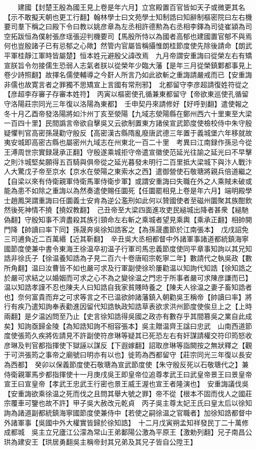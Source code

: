 　　建國【封楚王殷為國王見上卷是年六月】立宫殿置百官皆如天子或微更其名【示不敢擬天朝也更工行翻】翰林學士曰文苑學士知制誥曰知辭制樞密院曰左右機要司羣下稱之曰殿下令曰教以姚彦章為左丞相許德勲為右丞相李鐸為司徒崔潁為司空拓跋恒為僕射張彦瑶張迎判機要司【馬殷所恃以為國者高郁也建國置官郁不與焉何也豈殷諸子已有忌郁之心歟】然管内官屬皆稱攝惟朗桂節度使先除後請命【朗武平軍桂靜江軍時皆屬楚】恒本姓元避殷父諱改焉　九月帝謂安重誨曰從榮左右有矯宣朕旨令勿接儒生恐弱人志氣者朕以從榮年少臨大藩【是年三月從榮鎮鄴都事見上卷少詩照翻】故擇名儒使輔導之今姧人所言乃如此欲斬之重誨請嚴戒而已【安重誨非儒也故寛言者之罪獨不思矯宣上言國有常刑邪】　北都留守李彦超請復姓符從之【彦超李存審子存審本姓符】　丙寅以樞密使孔循兼東都留守【帝欲東巡使孔循留守洛陽莊宗同光三年復以洛陽為東都】　壬申契丹來請修好【好呼到翻】遣使報之　冬十月乙酉帝發洛陽將如汴州丁亥至滎陽【九域志滎陽縣在鄭州西六十里東至大梁一百四十里】民間譌言帝欲自擊吳又云欲制置東方諸侯宣武節度使檢校侍中朱守殷疑懼判官高密孫晟勸守殷反【高密漢古縣隋亂廢唐武德三年置于義城堡六年移就故夷安城即高密古縣也屬密州九域志在州東北一百二十里　考異曰江南録作孫忌今從王溥周世宗實録晟承正翻】守殷遂乘城拒守帝遣宣徽使范延光往諭之延光曰不早擊之則汴城堅矣願得五百騎與俱帝從之延光暮發未明行二百里抵大梁城下與汴人戰汴人大驚戊子帝至京水【京水在滎陽之東索水之西】遣御營使石敬瑭將親兵倍道繼之【自梁以來有侍衛親軍侍衛馬軍侍衛步軍】或謂安重誨曰失職在外之人乘賊未破或能為患不如除之重誨以為然奏遣使賜任圜死【任圜罷相見上卷是年六月】端明殿學士趙鳳哭謂重誨曰任圜義士安肯為逆公濫刑如此何以贊國使者至磁州圜聚其族酣飲然後死神情不撓【撓奴教翻】　己丑帝至大梁四面進攻吏民縋城出降者甚衆【縋馳偽翻】守殷知事不濟盡殺其族引頸命左右斬之乘城者望見乘輿【乘承正翻】相帥開門降【帥讀曰率下同】孫晟奔吳徐知誥客之【為孫晟盡節於江南張本】　戊戌詔免三司逋負近二百萬緡【近其靳翻】　辛丑吳大丞相都督中外諸軍事諸道都統鎮海寧國節度使兼中書令東海王徐温卒初温子行軍司馬忠義節度使同平章事知詢以其兄知誥非徐氏子【徐温養知誥為子見二百六十卷唐昭宗乾寧二年】數請代之執吳政【數所角翻】温曰汝曹皆不如也嚴可求及行軍副使徐玠屢勸温以知詢代知誥【徐知誥之於嚴可求結之以婚姻而可求之心不為之變徐温之門忠于所事者嚴可求陳彦謙而已】温以知誥孝謹不忍也陳夫人曰知誥自我家貧賤時養之【陳夫人徐温之妻子畜知誥者也】奈何富貴而弃之可求等言之不已温欲帥諸藩鎮入朝勸吳王稱帝【帥讀曰率】將行有疾乃遣知詢奉表勸進因留代知誥執政知誥草表欲求洪州節度使俟旦上之【上時兩翻】是夕温凶問至乃止【史言徐知誥得吳國之政亦有數存乎其間篡吳之業自此成矣】知詢亟歸金陵【為知誥知詢不相容張本】吳主贈温齊王諡曰忠武　山南西道節度使張筠久疾將佐請見不許副使符彦琳等疑其已死恐左右有奸謀請權交符印筠怒收彦琳及判官都指揮使下獄誣以謀反【下遐嫁翻】詔取彦琳等詣闕按之無狀釋之【觀于可洪張筠之事帝之廟號曰明亦有以也】徙筠為西都留守【莊宗同光三年復以長安為西都】　癸卯以保義節度使石敬瑭為宣武節度使【朱守殷反死以石敬瑭代之】兼侍衛親軍馬步都指揮使十一月庚戌吳王即皇帝位追尊孝武王曰武皇帝景王曰景皇帝宣王曰宣皇帝【孝武王忠武王行密也景王威王渥也宣王者隆演也】　安重誨議伐吳【安重誨欲乘徐温之死而伐之且問其舉大號之罪】帝不從【根本不固而伐人之國莊宗覆車可鑒也故不許】甲子吳大赦改元乾貞　丙子吳主尊太妃王氏曰皇太后以徐知詢為諸道副都統鎮海寧國節度使兼侍中【若使之嗣徐温之官職者】加徐知誥都督中外諸軍事【吳國中外大權實皆歸於徐知誥】　十二月戊寅朔孟知祥發民丁二十萬修成都城　吳主立兄廬江公濛為常山王弟鄱陽公激為平原王【激勅列翻】兄子南昌公珙為建安王【珙居勇翻吳主稱帝封其兄弟及其兄子皆自公陞王】　